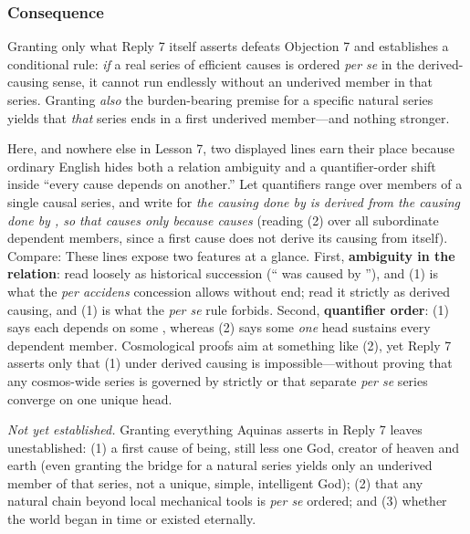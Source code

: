 \subsubsection*{Consequence}

Granting only what Reply 7 itself asserts defeats Objection 7 and establishes a conditional rule: \emph{if} a real series of efficient causes is ordered \emph{per se} in the derived-causing sense, it cannot run endlessly without an underived member in that series. Granting \emph{also} the burden-bearing premise for a specific natural series yields that \emph{that} series ends in a first underived member---and nothing stronger.

Here, and nowhere else in Lesson 7, two displayed lines earn their place because ordinary English hides both a relation ambiguity and a quantifier-order shift inside ``every cause depends on another.'' Let quantifiers range over members of a single causal series, and write  for \emph{the causing done by  is derived from the causing done by , so that  causes only because  causes} (reading (2) over all subordinate dependent members, since a first cause does not derive its causing from itself). Compare:
These lines expose two features at a glance. First, \textbf{ambiguity in the relation}: read  loosely as historical succession (`` was caused by ''), and (1) is what the \emph{per accidens} concession allows without end; read it strictly as derived causing, and (1) is what the \emph{per se} rule forbids. Second, \textbf{quantifier order}: (1) says each  depends on some , whereas (2) says some \emph{one} head  sustains every dependent member. Cosmological proofs aim at something like (2), yet Reply 7 asserts only that (1) under derived causing is impossible---without proving that any cosmos-wide series is governed by  strictly or that separate \emph{per se} series converge on one unique head.

\emph{Not yet established.} Granting everything Aquinas asserts in Reply 7 leaves unestablished: (1) a first cause of being, still less one God, creator of heaven and earth (even granting the bridge for a natural series yields only an underived member of that series, not a unique, simple, intelligent God); (2) that any natural chain beyond local mechanical tools is \emph{per se} ordered; and (3) whether the world began in time or existed eternally.

